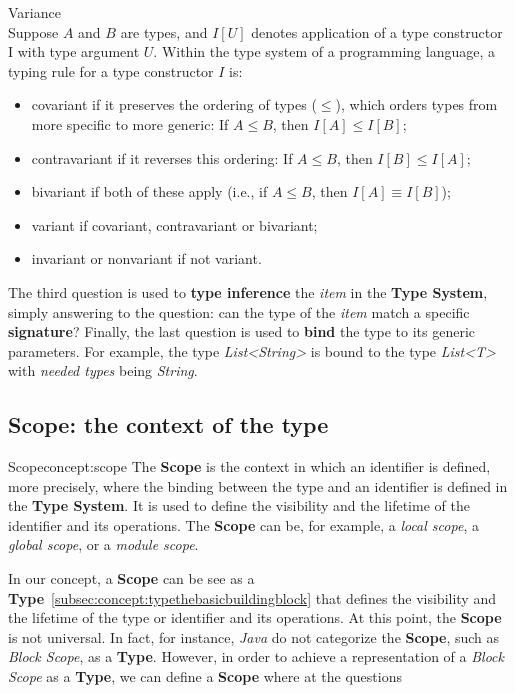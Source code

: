 \begin{definition}{Variance}\\
    Suppose $A$ and $B$ are types, and $I[U]$ denotes application of a type constructor I with type argument $U$. Within the type system of a programming language, a typing rule for a type constructor $I$ is:
    \begin{itemize}
        \item covariant if it preserves the ordering of types ($\leq$), which orders types from more specific to more generic: If $A \leq B$, then $I[A] \leq I[B]$;
        \item contravariant if it reverses this ordering: If $A \leq B$, then $I[B] \leq I[A]$;
        \item bivariant if both of these apply (i.e., if $A \leq B$, then $I[A] \equiv I[B]$);
        \item variant if covariant, contravariant or bivariant;
        \item invariant or nonvariant if not variant.
    \end{itemize}
\end{definition}

The third question is used to \textbf{type inference} the \textit{item} in the \textbf{Type System}, simply answering to the question: can the type of the \textit{item} match a specific \textbf{signature}?
Finally, the last question is used to \textbf{bind} the type to its generic parameters. For example, the type \textit{List<String>} is bound to the type \textit{List<T>} with \textit{needed types} being \textit{String}.


\subsection{Scope: the context of the type}\label{subsec:concept:ScopeTheContextOfTheType}

\begin{mydefinition}{Scope}{concept:scope}
The \textbf{Scope} is the context in which an identifier is defined, more precisely, where the binding between the type and an identifier is defined in the \textbf{Type System}. It is used to define the visibility and the lifetime of the identifier and its operations. The \textbf{Scope} can be, for example, a \textit{local scope}, a \textit{global scope}, or a \textit{module scope}.
\end{mydefinition}

In our concept, a \textbf{Scope} can be see as a \textbf{Type}~\ref{subsec:concept:typethebasicbuildingblock} that defines the visibility and the lifetime of the type or identifier and its operations. At this point, the \textbf{Scope} is not universal. In fact, for instance, \textit{Java} do not categorize the \textbf{Scope}, such as \textit{Block Scope}, as a \textbf{Type}. However, in order to achieve a representation of a \textit{Block Scope} as a \textbf{Type}, we can define a \textbf{Scope} where at the questions

